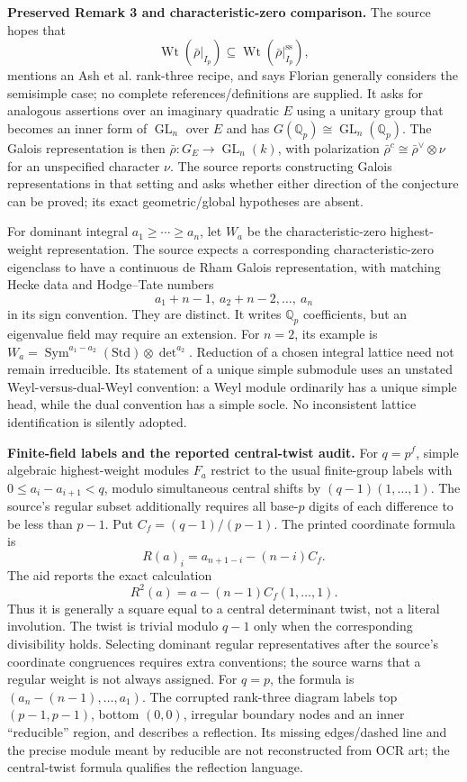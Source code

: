 \documentclass[11pt]{article}
\newcommand{\Q}{\mathbb{Q}}
\begin{document}
\textbf{Preserved Remark 3 and characteristic-zero comparison.} The source hopes that
\[
 \operatorname{Wt}(\bar\rho|_{I_p})
 \subseteq\operatorname{Wt}(\bar\rho|_{I_p}^{\mathrm{ss}}),
\]
mentions an Ash et al. rank-three recipe, and says Florian generally considers the semisimple case; no complete references/definitions are supplied. It asks for analogous assertions over an imaginary quadratic \(E\) using a unitary group that becomes an inner form of \(\operatorname{GL}_n\) over \(E\) and has \(G(\Q_p)\cong\operatorname{GL}_n(\Q_p)\). The Galois representation is then \(\bar\rho:G_E\to\operatorname{GL}_n(k)\), with polarization \(\bar\rho^c\cong\bar\rho^\vee\otimes\nu\) for an unspecified character \(\nu\). The source reports constructing Galois representations in that setting and asks whether either direction of the conjecture can be proved; its exact geometric/global hypotheses are absent.

For dominant integral \(a_1\geq\cdots\geq a_n\), let \(W_a\) be the characteristic-zero highest-weight representation. The source expects a corresponding characteristic-zero eigenclass to have a continuous de Rham Galois representation, with matching Hecke data and Hodge--Tate numbers
\[
 a_1+n-1,\ a_2+n-2,\ldots,\ a_n
\]
in its sign convention. They are distinct. It writes \(\Q_p\) coefficients, but an eigenvalue field may require an extension. For \(n=2\), its example is \(W_a=\operatorname{Sym}^{a_1-a_2}(\mathrm{Std})\otimes\det^{a_2}\). Reduction of a chosen integral lattice need not remain irreducible. Its statement of a unique simple submodule uses an unstated Weyl-versus-dual-Weyl convention: a Weyl module ordinarily has a unique simple head, while the dual convention has a simple socle. No inconsistent lattice identification is silently adopted.

\textbf{Finite-field labels and the reported central-twist audit.} For \(q=p^f\), simple algebraic highest-weight modules \(F_a\) restrict to the usual finite-group labels with \(0\leq a_i-a_{i+1}<q\), modulo simultaneous central shifts by \((q-1)(1,\ldots,1)\). The source's regular subset additionally requires all base-\(p\) digits of each difference to be less than \(p-1\). Put \(C_f=(q-1)/(p-1)\). The printed coordinate formula is
\[
 R(a)_i=a_{n+1-i}-(n-i)C_f.
\]
The aid reports the exact calculation
\[
 R^2(a)=a-(n-1)C_f(1,\ldots,1).
\]
Thus it is generally a square equal to a central determinant twist, not a literal involution. The twist is trivial modulo \(q-1\) only when the corresponding divisibility holds. Selecting dominant regular representatives after the source's coordinate congruences requires extra conventions; the source warns that a regular weight is not always assigned. For \(q=p\), the formula is \((a_n-(n-1),\ldots,a_1)\). The corrupted rank-three diagram labels top \((p-1,p-1)\), bottom \((0,0)\), irregular boundary nodes and an inner ``reducible'' region, and describes a reflection. Its missing edges/dashed line and the precise module meant by reducible are not reconstructed from OCR art; the central-twist formula qualifies the reflection language.
\end{document}
